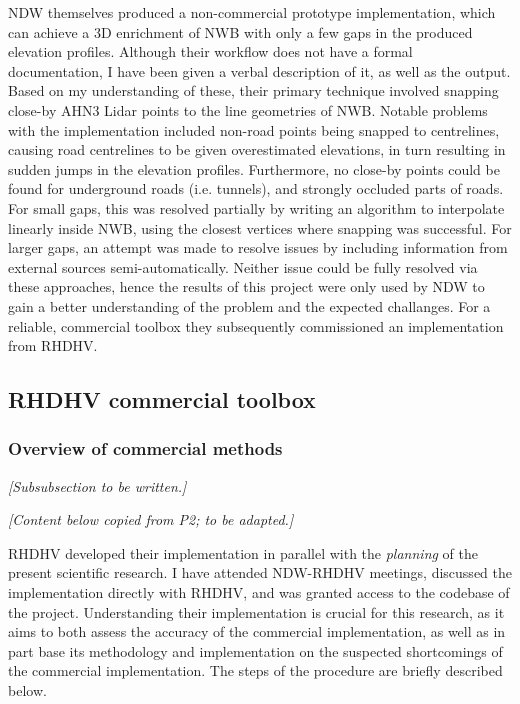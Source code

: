 NDW themselves produced a non-commercial prototype implementation, which can achieve a 3D enrichment of NWB with only a few gaps in the produced elevation profiles. Although their workflow does not have a formal documentation, I have been given a verbal description of it, as well as the output. Based on my understanding of these, their primary technique involved snapping close-by AHN3 Lidar points to the line geometries of NWB. Notable problems with the implementation included non-road points being snapped to centrelines, causing road centrelines to be given overestimated elevations, in turn resulting in sudden jumps in the elevation profiles. Furthermore, no close-by points could be found for underground roads (i.e. tunnels), and strongly occluded parts of roads. For small gaps, this was resolved partially by writing an algorithm to interpolate linearly inside NWB, using the closest vertices where snapping was successful. For larger gaps, an attempt was made to resolve issues by including information from external sources semi-automatically. Neither issue could be fully resolved via these approaches, hence the results of this project were only used by NDW to gain a better understanding of the problem and the expected challanges. For a reliable, commercial toolbox they subsequently commissioned an implementation from RHDHV.

\subsection{RHDHV commercial toolbox}
\label{sub:commercialproduct}

\subsubsection{Overview of commercial methods}

\textit{[Subsubsection to be written.]}

\textit{[Content below copied from P2; to be adapted.]}

RHDHV developed their implementation in parallel with the \textit{planning} of the present scientific research. I have attended NDW-RHDHV meetings, discussed the implementation directly with RHDHV, and was granted access to the codebase of the project. Understanding their implementation is crucial for this research, as it aims to both assess the accuracy of the commercial implementation, as well as in part base its methodology and implementation on the suspected shortcomings of the commercial implementation. The steps of the procedure are briefly described below.

